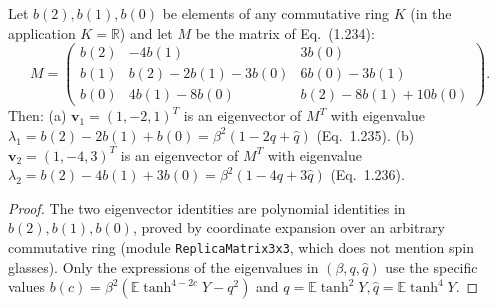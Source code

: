 \begin{theorem}
\label{thm:sg-tal:at-matrix}
  \leanok
{}
Let $b(2), b(1), b(0)$ be elements of any commutative ring $K$ (in the application $K = \mathbb R$) and let $M$ be the matrix of Eq.~(1.234):
\[
M = \begin{pmatrix}
b(2) & -4 b(1) & 3 b(0) \\
b(1) & b(2) - 2 b(1) - 3 b(0) & 6 b(0) - 3 b(1) \\
b(0) & 4 b(1) - 8 b(0) & b(2) - 8 b(1) + 10 b(0)
\end{pmatrix}.
\]
Then:
(a) $\mathbf{v}_1 = (1, -2, 1)^T$ is an eigenvector of $M^T$ with eigenvalue $\lambda_1 = b(2) - 2 b(1) + b(0) = \beta^2 (1 - 2 q + \hat{q})$ (Eq.~1.235).
(b) $\mathbf{v}_2 = (1, -4, 3)^T$ is an eigenvector of $M^T$ with eigenvalue $\lambda_2 = b(2) - 4 b(1) + 3 b(0) = \beta^2 (1 - 4 q + 3 \hat{q})$ (Eq.~1.236).
\end{theorem}
\begin{proof}
  \leanok
The two eigenvector identities are polynomial identities in $b(2), b(1), b(0)$, proved by coordinate expansion over an arbitrary commutative ring (module \texttt{ReplicaMatrix3x3}, which does not mention spin glasses).  Only the expressions of the eigenvalues in $(\beta, q, \hat q)$ use the specific values $b(c) = \beta^2(\mathbb E\tanh^{4-2c}Y - q^2)$ and $q = \mathbb E\tanh^2 Y, \hat{q} = \mathbb E\tanh^4 Y$.
\end{proof}

